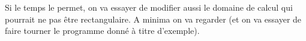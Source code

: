 \documentclass[12pt,a4paper]{article}
\begin{document}
\noindent Si le temps le permet, on va essayer de modifier aussi le domaine de calcul qui pourrait ne pas être rectangulaire. A minima on va regarder (et on va essayer de faire tourner le programme donné à titre d'exemple).

\end{document}
